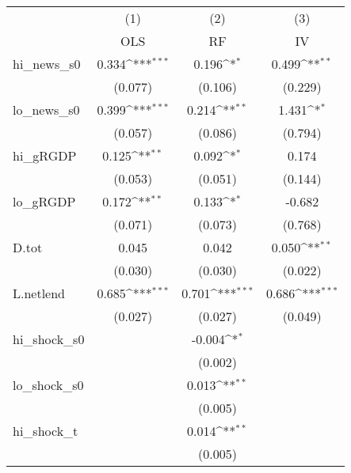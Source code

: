{
\def\sym#1{\ifmmode^{#1}\else\(^{#1}\)\fi}
\begin{tabular}{l*{3}{c}}
\toprule
            &\multicolumn{1}{c}{(1)}&\multicolumn{1}{c}{(2)}&\multicolumn{1}{c}{(3)}\\
            &\multicolumn{1}{c}{OLS}&\multicolumn{1}{c}{RF}&\multicolumn{1}{c}{IV}\\
\midrule
hi\_news\_s0  &       0.334\sym{***}&       0.196\sym{*}  &       0.499\sym{**} \\
            &     (0.077)         &     (0.106)         &     (0.229)         \\
\addlinespace
lo\_news\_s0  &       0.399\sym{***}&       0.214\sym{**} &       1.431\sym{*}  \\
            &     (0.057)         &     (0.086)         &     (0.794)         \\
\addlinespace
hi\_gRGDP    &       0.125\sym{**} &       0.092\sym{*}  &       0.174         \\
            &     (0.053)         &     (0.051)         &     (0.144)         \\
\addlinespace
lo\_gRGDP    &       0.172\sym{**} &       0.133\sym{*}  &      -0.682         \\
            &     (0.071)         &     (0.073)         &     (0.768)         \\
\addlinespace
D.tot       &       0.045         &       0.042         &       0.050\sym{**} \\
            &     (0.030)         &     (0.030)         &     (0.022)         \\
\addlinespace
L.netlend   &       0.685\sym{***}&       0.701\sym{***}&       0.686\sym{***}\\
            &     (0.027)         &     (0.027)         &     (0.049)         \\
\addlinespace
hi\_shock\_s0 &                     &      -0.004\sym{*}  &                     \\
            &                     &     (0.002)         &                     \\
\addlinespace
lo\_shock\_s0 &                     &       0.013\sym{**} &                     \\
            &                     &     (0.005)         &                     \\
\addlinespace
hi\_shock\_t  &                     &       0.014\sym{**} &                     \\
            &                     &     (0.005)         &                     \\

\end{tabular}}
